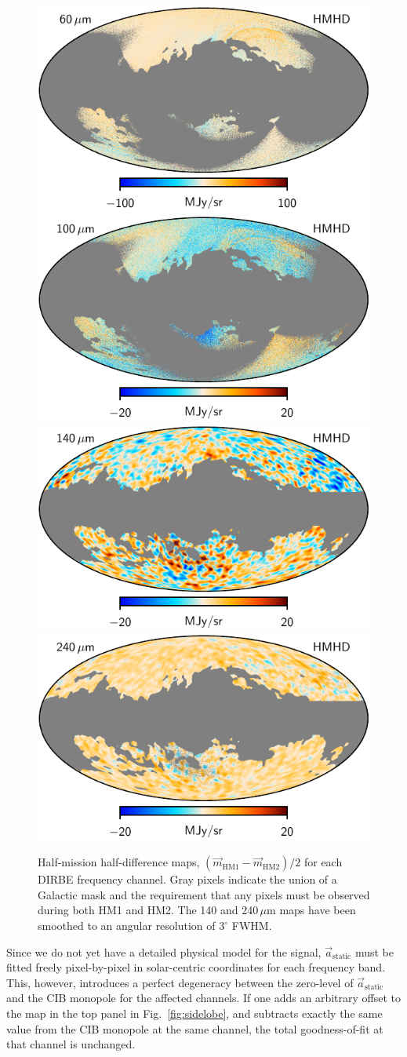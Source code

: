 \documentclass{aa}
\renewcommand{\a}[0]{\vec{a}}
\newcommand{\m}[0]{\vec{m}}
\begin{document}
\begin{figure}
  \includegraphics[width=0.42\linewidth]{figs/dirbe_07_hmhd_v4.pdf}\hspace*{5mm}
  \includegraphics[width=0.42\linewidth]{figs/dirbe_08_hmhd_v4.pdf}\\
  \includegraphics[width=0.42\linewidth]{figs/dirbe_09_hmhd_v4_3deg.pdf}\hspace*{5mm}
  \includegraphics[width=0.42\linewidth]{figs/dirbe_10_hmhd_v4_3deg.pdf}
  \caption{Half-mission half-difference maps, $(\m_{\mathrm{HM1}}-\m_{\mathrm{HM2}})/2$ for each DIRBE frequency channel. Gray pixels indicate the union of a Galactic mask and the requirement that any pixels must be observed during both HM1 and HM2. The 140 and 240\,$\mu\mathrm{m}$ maps have been smoothed to an angular resolution of $3^{\circ}$ FWHM.}
  \label{fig:hmhd}
\end{figure}



Since we do not yet have a detailed physical model for the signal,
$\a_{\mathrm{static}}$ must be fitted freely pixel-by-pixel in
solar-centric coordinates for each frequency band. This, however,
introduces a perfect degeneracy between the zero-level of
$\a_{\mathrm{static}}$ and the CIB monopole for the affected channels.
If one adds an arbitrary offset to the map in the top panel in
Fig.~\ref{fig:sidelobe}, and subtracts exactly the same value from the
CIB monopole at the same channel, the total goodness-of-fit at that
channel is unchanged.
\end{document}
